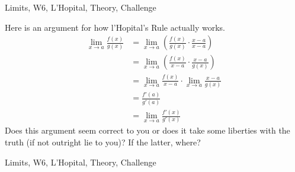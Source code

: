 \begin{tagblock}{Limits, W6, L'Hopital, Theory, Challenge}
\begin{question}

Here is an argument for how l'Hopital's Rule actually works. 
\begin{align*}
\lim_{x\to a}\frac {f(x)}{g(x)}&=\lim_{x\to a}\left(\frac {f(x)}{g(x)}\cdot\frac{x-a}{x-a}\right) \\
&=\lim_{x\to a}\left(\frac {f(x)}{x-a}\cdot\frac{x-a}{g(x)}\right)\\
&=\lim_{x\to a}\frac {f(x)}{x-a}\cdot\lim_{x\to a}\frac{x-a}{g(x)}\\
&=\frac {f'(a)}{g'(a)}\\
&=\lim_{x\to a}\frac {f'(x)}{g'(x)}
\end{align*}
Does this argument seem correct to you or does it take some liberties with the truth (if not outright lie to you)? If the latter, where?
	
	
\begin{tags}
	   Limits, W6, L'Hopital, Theory, Challenge
\end{tags}
	
\begin{diary}
	    
\end{diary}
	
\begin{solution}
	  
\end{solution}
	
\end{question}

\end{tagblock}

